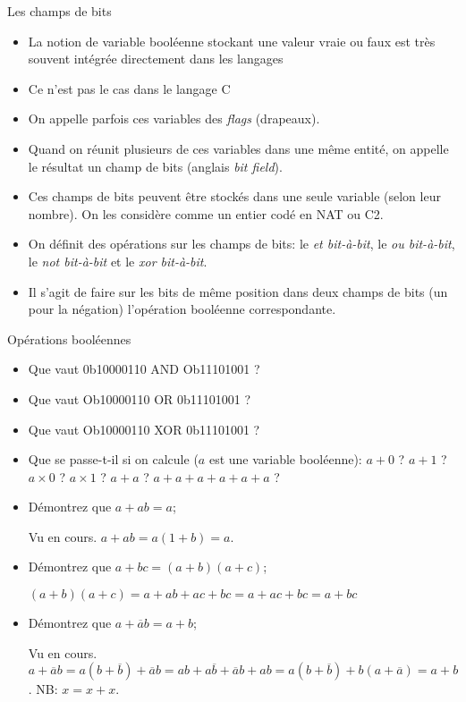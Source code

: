 \begin{frame}{Les champs de bits}
  \begin{itemize}
  \item La notion de variable booléenne stockant une valeur vraie ou
    faux est très souvent intégrée directement dans les langages
  \item[\dialogerror] Ce n'est pas le cas dans le langage C
  \item On appelle parfois ces variables des \emph{flags} (drapeaux).
  \item Quand on réunit plusieurs de ces variables dans une même entité,
    on appelle le résultat un champ de bits (anglais \emph{bit field}).
  \item Ces champs de bits peuvent être stockés dans une seule variable
    (selon leur nombre). On les considère comme un entier codé en NAT ou
    C2.
  \item On définit des opérations sur les champs de bits: le \emph{et
      bit-à-bit}, le \emph{ou bit-à-bit}, le \emph{not bit-à-bit} et le
    \emph{xor bit-à-bit}.
  \item[\dialogsystem] Il s'agit de faire sur les bits de même position
    dans deux champs de bits (un pour la négation) l'opération booléenne
    correspondante.
  \end{itemize}
\end{frame}
\begin{exercice}
  \begin{exercicelet}{Opérations booléennes}
    \begin{itemize}
    \item Que vaut 0b10000110 AND Ob11101001 ?
    \item Que vaut Ob10000110  OR 0b11101001 ?
    \item Que vaut Ob10000110 XOR 0b11101001 ?
    \item Que se passe-t-il si on calcule ($a$ est une variable
      booléenne): $a+0$ ? $a+1$ ? $a\times 0$ ? $a\times 1$ ? $a+a$ ? $a+a+a+a+a+a$ ?
    \item Démontrez que $a+ab=a$;
      \begin{correction}Vu en cours. $a+ab=a(1+b)=a$.\end{correction}
    \item Démontrez que $a+bc=(a+b)(a+c)$;
      \begin{correction}
        $(a+b)(a+c)=a+ab+ac+bc=a+ac+bc=a+bc$
      \end{correction}
    \item Démontrez que $a+\overline{a}b=a+b$;
      \begin{correction}Vu en
        cours. $a+\overline{a}b=a(b+\overline{b})+\overline{a}b=ab+a\overline{b}+
        \overline{a}b+ab=a(b+\overline{b})+b(a+\overline{a})=a+b$. NB:
        $x=x+x$.\end{correction}
    \end{itemize}
  \end{exercicelet}
\end{exercice}
